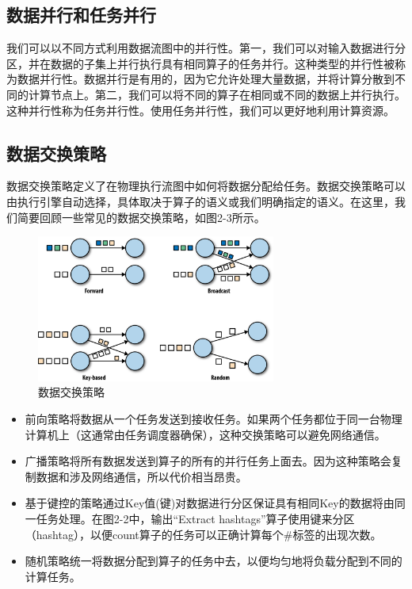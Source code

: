 \documentclass[cn,11pt,chinese]{elegantbook}
\begin{document}
\subsection{数据并行和任务并行}

我们可以以不同方式利用数据流图中的并行性。第一，我们可以对输入数据进行分区，并在数据的子集上并行执行具有相同算子的任务并行。这种类型的并行性被称为数据并行性。数据并行是有用的，因为它允许处理大量数据，并将计算分散到不同的计算节点上。第二，我们可以将不同的算子在相同或不同的数据上并行执行。这种并行性称为任务并行性。使用任务并行性，我们可以更好地利用计算资源。

\subsection{数据交换策略}

数据交换策略定义了在物理执行流图中如何将数据分配给任务。数据交换策略可以由执行引擎自动选择，具体取决于算子的语义或我们明确指定的语义。在这里，我们简要回顾一些常见的数据交换策略，如图2-3所示。

\begin{figure}[htbp]
  \centering
  \includegraphics[width=0.7\textwidth]{images/spaf_0203.png}
  \caption{数据交换策略}
\end{figure}

\begin{itemize}
    \item 前向策略将数据从一个任务发送到接收任务。如果两个任务都位于同一台物理计算机上（这通常由任务调度器确保），这种交换策略可以避免网络通信。
    \item 广播策略将所有数据发送到算子的所有的并行任务上面去。因为这种策略会复制数据和涉及网络通信，所以代价相当昂贵。
    \item 基于键控的策略通过Key值(键)对数据进行分区保证具有相同Key的数据将由同一任务处理。在图2-2中，输出“Extract hashtags”算子使用键来分区（hashtag），以便count算子的任务可以正确计算每个\#标签的出现次数。
    \item 随机策略统一将数据分配到算子的任务中去，以便均匀地将负载分配到不同的计算任务。
\end{itemize}
\end{document}
